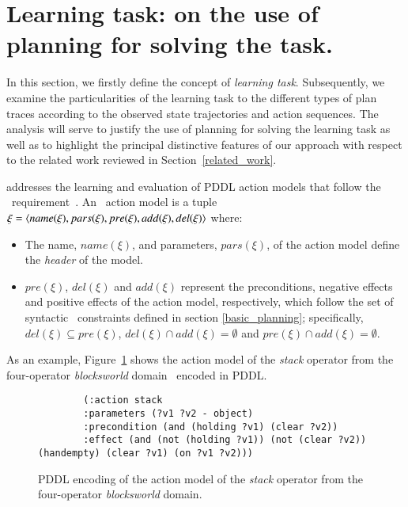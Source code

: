 
\section{Learning task: on the use of planning for solving the task.}
\label{task_definition}

In this section, we firstly define the concept of \emph{learning task}. Subsequently, we examine the particularities of the learning task to the different types of plan traces according to the observed state trajectories and action sequences. The analysis will serve to justify the use of planning for solving the learning task as well as to highlight the principal distinctive features of our approach \FAMA with respect to the related work reviewed in Section~\ref{related_work}.

\vspace{0.1cm}

\FAMA addresses the learning and evaluation of PDDL action models that follow the \strips\ requirement~\cite{mcdermott1998pddl,fox2003pddl2}. An \strips\ action model is a tuple $\xi={\langle name(\xi),pars(\xi),pre(\xi),add(\xi),del(\xi) \rangle}$ where:

\begin{itemize}
	\item The name, $name(\xi)$, and parameters, $pars(\xi)$, of the action model define the {\em header} of the model.
	\item $pre(\xi)$, $del(\xi)$ and $add(\xi)$ represent the preconditions, negative effects and positive effects of the action model, respectively, \textcolor[rgb]{1.00,0.00,0.00}{which follow the set of syntactic \strips\ constraints defined in section \ref{basic_planning}; specifically,} $del(\xi)\subseteq pre(\xi)$, $del(\xi)\cap add(\xi)=\emptyset$ and $pre(\xi)\cap add(\xi)=\emptyset$.
\end{itemize}


As an example, Figure~\ref{fig:stack} shows the action model of the {\em stack} operator from the four-operator {\em blocksworld} domain~\cite{slaney2001blocks} encoded in PDDL.

\begin{figure}[hbt!]
	\begin{footnotesize}
		\begin{verbatim}
		(:action stack
		:parameters (?v1 ?v2 - object)
		:precondition (and (holding ?v1) (clear ?v2))
		:effect (and (not (holding ?v1)) (not (clear ?v2)) (handempty) (clear ?v1) (on ?v1 ?v2)))
		\end{verbatim}
	\end{footnotesize}
	\caption{PDDL encoding of the action model of the {\em stack} operator from the four-operator {\em blocksworld} domain.}
	\label{fig:stack}
\end{figure}


